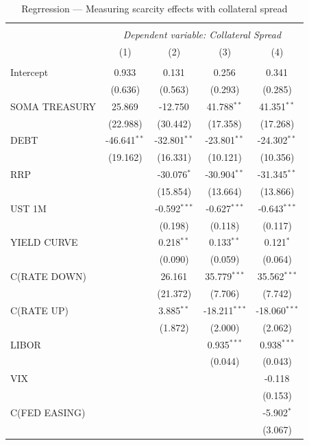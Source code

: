 \documentclass[11pt,a4paper,english,oneside]{article}
\begin{document}
\begin{table}[!htbp] \centering
\caption{Regrression --- Measuring scarcity effects with collateral spread}
\label{table:reg2}
\begin{tabular}{@{\extracolsep{5pt}}lcccc}
\\[-1.8ex]\hline
\hline \\[-1.8ex]
& \multicolumn{4}{c}{\textit{Dependent variable: Collateral Spread}} \
\cr \cline{4-5}
\\[-1.8ex] & (1) & (2) & (3) & (4) \\
\hline \\[-1.8ex]
 Intercept & 0.933$^{}$ & 0.131$^{}$ & 0.256$^{}$ & 0.341$^{}$ \\
  & (0.636) & (0.563) & (0.293) & (0.285) \\
 SOMA TREASURY & 25.869$^{}$ & -12.750$^{}$ & 41.788$^{**}$ & 41.351$^{**}$ \\
  & (22.988) & (30.442) & (17.358) & (17.268) \\
 DEBT & -46.641$^{**}$ & -32.801$^{**}$ & -23.801$^{**}$ & -24.302$^{**}$ \\
  & (19.162) & (16.331) & (10.121) & (10.356) \\
 RRP & & -30.076$^{*}$ & -30.904$^{**}$ & -31.345$^{**}$ \\
  & & (15.854) & (13.664) & (13.866) \\
 UST 1M & & -0.592$^{***}$ & -0.627$^{***}$ & -0.643$^{***}$ \\
  & & (0.198) & (0.118) & (0.117) \\
 YIELD CURVE & & 0.218$^{**}$ & 0.133$^{**}$ & 0.121$^{*}$ \\
  & & (0.090) & (0.059) & (0.064) \\
 C(RATE DOWN) & & 26.161$^{}$ & 35.779$^{***}$ & 35.562$^{***}$ \\
  & & (21.372) & (7.706) & (7.742) \\
 C(RATE UP) & & 3.885$^{**}$ & -18.211$^{***}$ & -18.060$^{***}$ \\
  & & (1.872) & (2.000) & (2.062) \\
 LIBOR & & & 0.935$^{***}$ & 0.938$^{***}$ \\
  & & & (0.044) & (0.043) \\
 VIX & & & & -0.118$^{}$ \\
  & & & & (0.153) \\
 C(FED EASING) & & & & -5.902$^{*}$ \\
  & & & & (3.067) \\

\end{tabular}
\end{table}
\end{document}
